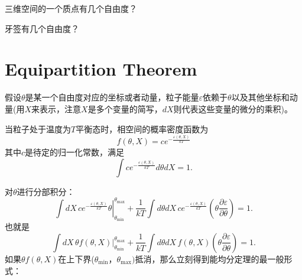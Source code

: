 \documentclass[CJK]{beamer}
\begin{document}
\begin{frame}
\bch
    {\large
      三维空间的一个质点有几个自由度？
    }


\ech
\end{frame}


\begin{frame}
\bch

    {\large
      牙签有几个自由度？
      }


\ech
\end{frame}

\section{Equipartition Theorem}



\begin{frame}
\bch
{\large
  假设$\theta$是某一个自由度对应的坐标或者动量，粒子能量$\varepsilon$依赖于$\theta$以及其他坐标和动量(用$X$来表示，注意$X$是多个变量的简写，$dX$则代表这些变量的微分的乘积)。

  当粒子处于温度为$T$平衡态时，相空间的概率密度函数为
$$f(\theta,X) = c e^{-\frac{\varepsilon(\theta,X)}{kT}} $$
其中$c$是待定的归一化常数，满足
$$  \int c e^{-\frac{\varepsilon(\theta,X)}{kT}} d\theta dX = 1. $$
}
\ech
\end{frame}


\begin{frame}
\bch
    {\large
      对$\theta$进行分部积分：
      $$ \int dX\, \left. c e^{-\frac{\varepsilon(\theta,X)}{kT}} \theta\right\vert_{\theta_{\min}}^{\theta_{\max}} + \frac{1}{kT}\int d\theta dX \, c e^{-\frac{\varepsilon(\theta,X)}{kT}} \left(\theta\frac{\partial\varepsilon}{\partial\theta}\right)  = 1. $$
      也就是
      $$ \int dX\, \left.  \theta  f(\theta,X) \right\vert_{\theta_{\min}}^{\theta_{\max}} + \frac{1}{kT}\int d\theta dX \,  f(\theta,X)\left(\theta\frac{\partial\varepsilon}{\partial\theta}\right)  = 1. $$
      {\blue 如果$\theta f(\theta,X)$在上下界($\theta_{\min}$，$\theta_{\max})$抵消}，那么立刻得到能均分定理的最一般形式：
   }
\ech
\end{frame}
\end{document}

